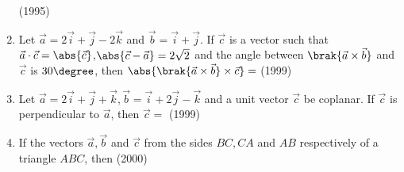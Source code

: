 \begin{enumerate}[label=\thesubsection.\arabic*.,ref=\thesubsection.\theenumi]
  \hfill (1995)
  \begin{enumerate}
  \end{enumerate}
\item Let $\vec{a}=2\vec{i}+\vec{j}-2\vec{k}$ and $\vec{b}=\vec{i}+\vec{j}$. If $\vec{c}$ is  a vector such that $\vec{a} \cdot \vec{c}=\abs{\vec{c}}$,$\abs{\vec{c}-\vec{a}}=2\sqrt{2}$ and the angle between $\brak{\vec{a} \times \vec{b}}$ and $\vec{c}$ is $30\degree$, then $\abs{\brak{\vec{a} \times \vec{b}} \times \vec{c}} = $  
\hfill (1999)
\begin{enumerate}
\end{enumerate}
\item Let $\vec{a}=2\vec{i}+\vec{j}+\vec{k},\vec{b}=\vec{i}+2\vec{j}-\vec{k}$ and a unit vector $\vec{c}$ be coplanar. If $\vec{c}$ is perpendicular to $\vec{a}$, then $\vec{c}=$
\hfill (1999)
\begin{enumerate}
\end{enumerate}
\item If the vectors $\vec{a},\vec{b}$ and $\vec{c}$ from the sides $BC,CA$ and $AB$ respectively of a triangle $ABC$, then
\hfill (2000)
\begin{enumerate}
\end{enumerate}
\end{enumerate}
